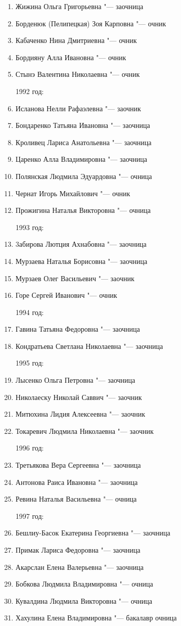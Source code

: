 \begin{enumerate}[nosep]
{1991 год:}
	\item Жижина Ольга Григорьевна "--- заочница
	\item Борденюк (Пелипецкая) Зоя Карповна "--- очник
	\item Кабаченко Нина Дмитриевна "--- очник
	\item Бордияну Алла Ивановна "--- очник
	\item Стынэ Валентина Николаевна "--- очник

{1992 год:}
	\item Исланова Нелли Рафаэлевна "--- заочник
	\item Бондаренко Татьяна Ивановна "--- заочница
	\item Кроливец Лариса Анатольевна "--- заочница
	\item Царенко Алла Владимировна "--- заочница
	\item Полянская Людмила Эдуардовна "--- очница
	\item Чернат Игорь Михайлович "--- очник
	\item Прожигина Наталья Викторовна "--- очница

{1993 год:}
	\item 3абирова Лютция Ахнабовна "--- заочница
	\item Мурзаева Наталья Борисовна "--- заочница
	\item Мурзаев Олег Васильевич "--- заочник
	\item Горе Сергей Иванович "--- очник

{1994 год:}
	\item Гавина Татьяна Федоровна "--- заочница
	\item Кондратьева Светлана Николаевна "--- заочница

{1995 год:}
	\item Лысенко Ольга Петровна "--- заочница
	\item Николаеску Николай Саввич "--- заочник
	\item Митюхина Лидия Алексеевна "--- заочник
	\item Токаревич Людмила Николаевна "--- заочник

{1996 год:}
	\item Третьякова Вера Сергеевна "--- заочница
	\item Антонова Раиса Ивановна "--- заочница
	\item Ревина Наталья Васильевна "--- очница

{1997 год:}
	\item Бешлиу-Басок Екатерина Георгиевна "--- заочница
	\item Примак Лариса Федоровна "--- заочница 
	\item Акарслан Елена Валерьевна "--- заочница
	\item Бобкова Людмила Владимировна "--- очница
	\item Кувалдина Людмила Викторовна "--- очница
	\item Хахулина Елена Владимировна "--- бакалавр очница


\end{enumerate}

